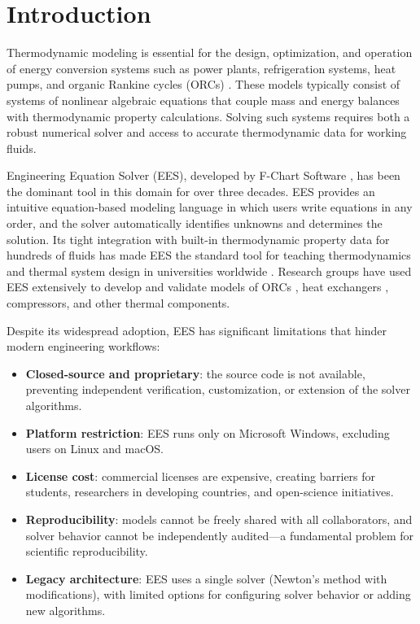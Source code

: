 \documentclass[review,3p]{elsarticle}
\begin{document}
\section{Introduction}
\label{sec:introduction}

Thermodynamic modeling is essential for the design, optimization, and operation of energy conversion systems such as power plants, refrigeration systems, heat pumps, and organic Rankine cycles (ORCs) \cite{Quoilin2013, Lecompte2015}. These models typically consist of systems of nonlinear algebraic equations that couple mass and energy balances with thermodynamic property calculations. Solving such systems requires both a robust numerical solver and access to accurate thermodynamic data for working fluids.

Engineering Equation Solver (EES), developed by F-Chart Software \cite{Klein2023, EES2024}, has been the dominant tool in this domain for over three decades. EES provides an intuitive equation-based modeling language in which users write equations in any order, and the solver automatically identifies unknowns and determines the solution. Its tight integration with built-in thermodynamic property data for hundreds of fluids has made EES the standard tool for teaching thermodynamics and thermal system design in universities worldwide \cite{Nellis2016}. Research groups have used EES extensively to develop and validate models of ORCs \cite{Quoilin2011, Lemort2009}, heat exchangers \cite{Desideri2014}, compressors, and other thermal components.

Despite its widespread adoption, EES has significant limitations that hinder modern engineering workflows:
\begin{itemize}
    \item \textbf{Closed-source and proprietary}: the source code is not available, preventing independent verification, customization, or extension of the solver algorithms.
    \item \textbf{Platform restriction}: EES runs only on Microsoft Windows, excluding users on Linux and macOS.
    \item \textbf{License cost}: commercial licenses are expensive, creating barriers for students, researchers in developing countries, and open-science initiatives.
    \item \textbf{Reproducibility}: models cannot be freely shared with all collaborators, and solver behavior cannot be independently audited---a fundamental problem for scientific reproducibility.
    \item \textbf{Legacy architecture}: EES uses a single solver (Newton's method with modifications), with limited options for configuring solver behavior or adding new algorithms.
\end{itemize}
\end{document}
